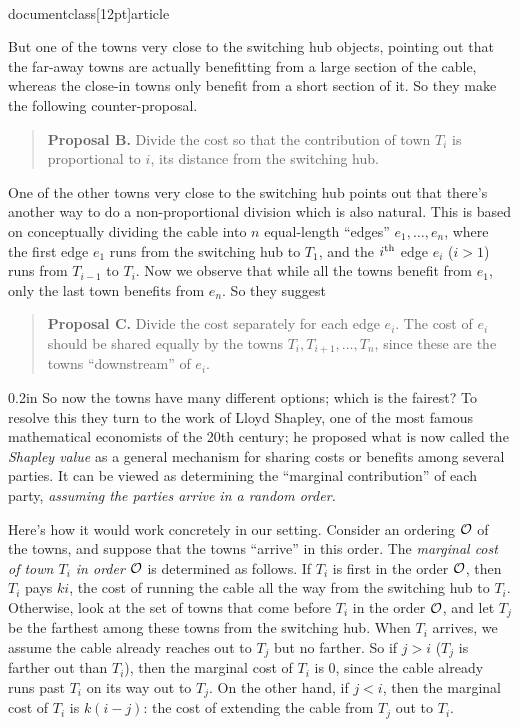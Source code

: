 \\documentclass[12pt]{article}
\def\gap{0.2in}
\begin{document}
\begin{enumerate}
But one of the towns very close to the switching hub objects,
pointing out that the far-away towns are actually
benefitting from a large section of the cable,
whereas the close-in towns only benefit from a short section of it.
So they make the following counter-proposal.
\begin{quote}
{\bf Proposal B.} Divide the cost so that the contribution
of town $T_i$ is proportional to $i$, its distance
from the switching hub.
\end{quote}

One of the other towns very close to the switching hub
points out that there's another way to do
a non-proportional division which is also natural.
This is based on conceptually dividing the
cable into $n$ equal-length ``edges'' $e_1, \ldots, e_n$,
where the first edge $e_1$ runs from the switching hub to $T_1$,
and the $i^{\rm th}$ edge $e_i$ ($i > 1$) runs from
$T_{i-1}$ to $T_i$.
Now we observe that while all the towns benefit from
$e_1$, only the last town benefits from $e_n$.
So they suggest
\begin{quote}
{\bf Proposal C.} Divide the cost separately for each edge $e_i$.
The cost of $e_i$ should be shared equally by the towns
$T_i, T_{i+1}, \ldots, T_n$, since these are the towns
``downstream'' of $e_i$.
\end{quote}

\gap
So now the towns have many different options; which is the fairest?
To resolve this they turn to the work of Lloyd Shapley,
one of the most famous mathematical economists of the 20th century;
he proposed what is now called the {\em Shapley value}
as a general mechanism for sharing costs or benefits among several parties.
It can be viewed as determining the ``marginal contribution''
of each party, {\em assuming the parties arrive in a random order.}

Here's how it would work concretely in our setting.
Consider an ordering $\cal O$ of the towns,
and suppose that the towns ``arrive'' in this order.
The {\em marginal cost of town $T_i$ in order $\cal O$}
is determined as follows.
If $T_i$ is first in the order $\cal O$, then $T_i$ pays
$ki$, the cost of running the cable all the way from
the switching hub to $T_i$.
Otherwise, look at the set of
towns that come before $T_i$ in the order $\cal O$,
and let $T_j$ be the farthest among these towns from the
switching hub.
When $T_i$ arrives, we assume the cable already
reaches out to $T_j$ but no farther.
So if $j > i$ ($T_j$ is farther out than $T_i$),
then the marginal cost of $T_i$ is $0$, since
the cable already runs past $T_i$ on its way out to $T_j$.
On the other hand, if $j < i$, then the marginal cost of $T_i$
is $k(i-j)$: the cost of extending the cable from
$T_j$ out to $T_i$.


\end{enumerate}
\end{document}
